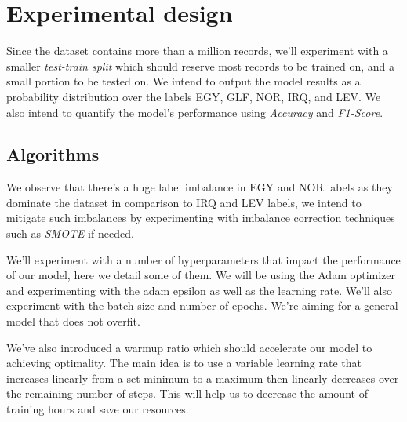 \documentclass[12pt]{diazessay}
\begin{document}
    
    \section{Experimental design}
        Since the dataset contains more than a million records, we'll experiment with a smaller \emph{test-train split} which should reserve most records to be trained on, and a small portion to be tested on. We intend to output the model results as a probability distribution over the labels EGY, GLF, NOR, IRQ, and LEV. We also intend to quantify the model's performance using \emph{Accuracy} and \emph{F1-Score}.

        \subsection{Algorithms}
        
        We observe that there's a huge label imbalance in EGY and NOR labels as they dominate the dataset in comparison to IRQ and LEV labels, we intend to mitigate such imbalances by experimenting with imbalance correction techniques such as \emph{SMOTE} if needed.
        
        We'll experiment with a number of hyperparameters that impact the performance of our model, here we detail some of them. We will be using the Adam optimizer and experimenting with the adam epsilon as well as the learning rate. We'll also experiment with the batch size and number of epochs. We're aiming for a general model that does not overfit.
        
        We've also introduced a warmup ratio which should accelerate our model to achieving optimality. The main idea is to use a variable learning rate that increases linearly from a set minimum to a maximum then linearly decreases over the remaining number of steps. This will help us to decrease the amount of training hours and save our resources.
        
\end{document}
